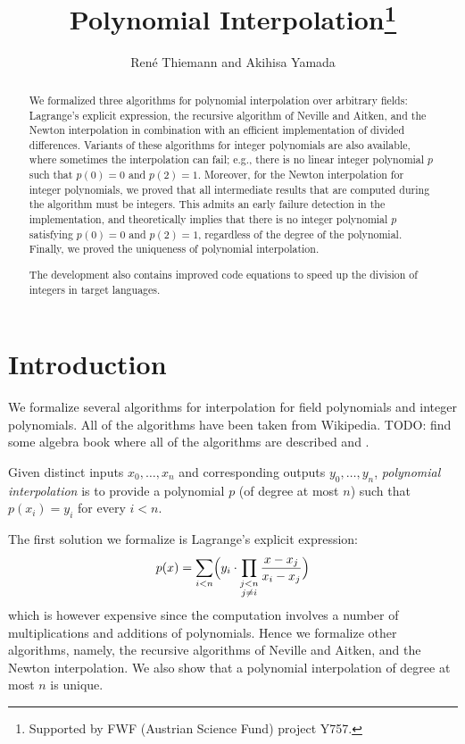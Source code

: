 \documentclass[11pt,a4paper]{article}
\begin{document}
\title{Polynomial Interpolation\footnote{Supported by FWF (Austrian Science Fund) project Y757.}}
\author{Ren\'e Thiemann and Akihisa Yamada}
\maketitle

\begin{abstract}
We formalized three algorithms for polynomial interpolation over arbitrary fields: 
Lagrange's explicit expression,
the recursive algorithm of Neville and Aitken,
and the Newton interpolation in combination with an efficient implementation of divided differences.
Variants of these algorithms for integer polynomials are also available,
where sometimes the interpolation can fail; e.g., there is no
linear integer polynomial $p$ such that $p(0) = 0$ and $p(2) = 1$. Moreover, for
the Newton interpolation for integer polynomials, we proved that all intermediate 
results that are computed during the algorithm must be integers.
This admits an early failure detection in the implementation, and theoretically implies that
there is no integer polynomial $p$ satisfying $p(0) = 0$ and $p(2) = 1$, regardless
of the degree of the polynomial.
Finally, we proved the uniqueness of polynomial interpolation.

The development also contains improved code equations to speed up the division of integers
in target languages.
\end{abstract}

\tableofcontents

\section{Introduction}

We formalize several algorithms for interpolation for field polynomials and integer polynomials.
All of the algorithms have been taken from Wikipedia.
TODO: find some algebra book where all of the algorithms are described and \cite{it}.

Given distinct inputs $x_0,\dots,x_n$ and corresponding outputs $y_0,\dots,y_n$,
\emph{polynomial interpolation} is to provide a polynomial $p$ (of degree at most $n$)
such that $p(x_i) = y_i$ for every $i < n$.

The first solution we formalize is Lagrange's explicit expression:
\[
	p(x) = \sum_{i<n}
		\Bigl(y_i \cdot \prod_{\substack{j<n\\j \neq i}}\frac{x-x_j}{x_i-x_j}
		\Bigr)
\]
which is however expensive since the computation involves a number of multiplications and additions of polynomials.
Hence we formalize other algorithms, namely, the recursive algorithms of Neville and Aitken,
and the Newton interpolation.
We also show that a polynomial interpolation of degree at most $n$ is unique.
\end{document}
